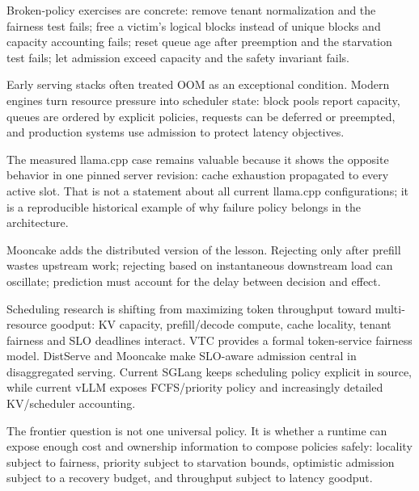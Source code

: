 Broken-policy exercises are concrete: remove tenant normalization and the fairness
test fails; free a victim's logical blocks instead of unique blocks and capacity
accounting fails; reset queue age after preemption and the starvation test fails; let
admission exceed capacity and the safety invariant fails.


Early serving stacks often treated OOM as an exceptional condition. Modern engines
turn resource pressure into scheduler state: block pools report capacity, queues are
ordered by explicit policies, requests can be deferred or preempted, and production
systems use admission to protect latency objectives.

The measured llama.cpp case remains valuable because it shows the opposite behavior
in one pinned server revision: cache exhaustion propagated to every active slot.
That is not a statement about all current llama.cpp configurations; it is a
reproducible historical example of why failure policy belongs in the architecture.

Mooncake adds the distributed version of the lesson. Rejecting only after prefill
wastes upstream work; rejecting based on instantaneous downstream load can oscillate;
prediction must account for the delay between decision and effect.


Scheduling research is shifting from maximizing token throughput toward multi-resource
goodput: KV capacity, prefill/decode compute, cache locality, tenant fairness and SLO
deadlines interact. VTC provides a formal token-service fairness model. DistServe and
Mooncake make SLO-aware admission central in disaggregated serving. Current SGLang
keeps scheduling policy explicit in source, while current vLLM exposes FCFS/priority
policy and increasingly detailed KV/scheduler accounting.

The frontier question is not one universal policy. It is whether a runtime can expose
enough cost and ownership information to compose policies safely: locality subject to
fairness, priority subject to starvation bounds, optimistic admission subject to a
recovery budget, and throughput subject to latency goodput.

